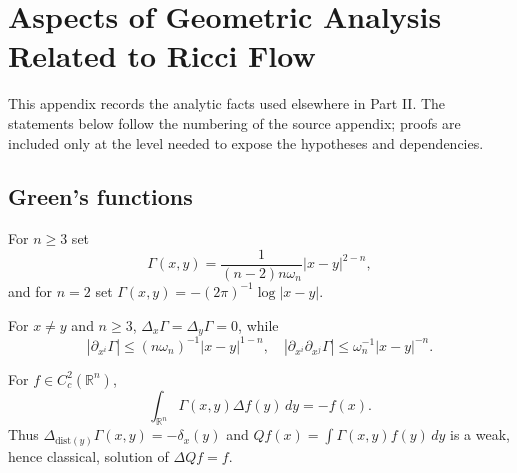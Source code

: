 \chapter{Aspects of Geometric Analysis Related to Ricci Flow}
\label{ch:chow-ii-geometric-analysis}

This appendix records the analytic facts used elsewhere in Part II.  The
statements below follow the numbering of the source appendix; proofs are
included only at the level needed to expose the hypotheses and dependencies.

\section{Green's functions}

\begin{definition}
\label{def:chow-ii-euclidean-green-function}
For $n\ge3$ set
\[
\Gamma(x,y)=\frac{1}{(n-2)n\omega_n}|x-y|^{2-n},
\]
and for $n=2$ set $\Gamma(x,y)=-(2\pi)^{-1}\log|x-y|$.
\end{definition}

\begin{lemma}
\label{lem:chow-ii-euclidean-green-identities}
For $x\ne y$ and $n\ge3$, $\Delta_x\Gamma=\Delta_y\Gamma=0$, while
\[
|\partial_{x^i}\Gamma|\le(n\omega_n)^{-1}|x-y|^{1-n},
\quad |\partial_{x^i}\partial_{x^j}\Gamma|\le\omega_n^{-1}|x-y|^{-n}.
\]
\end{lemma}

\begin{theorem}
\label{thm:chow-ii-euclidean-green-fundamental}
For $f\in C_c^2(\mathbb R^n)$,
\[
\int_{\mathbb R^n}\Gamma(x,y)\Delta f(y)\,dy=-f(x).
\]
Thus $\Delta_{\mathrm{dist}(y)}\Gamma(x,y)=-\delta_x(y)$ and
$Qf(x)=\int\Gamma(x,y)f(y)\,dy$ is a weak, hence classical, solution of
$\Delta Qf=f$.
\end{theorem}

